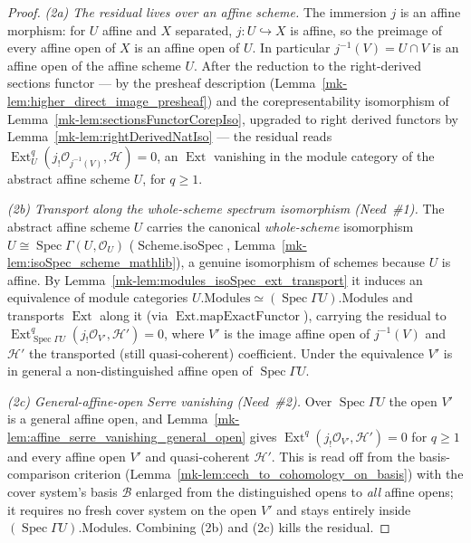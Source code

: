 \begin{proof}
  \emph{(2a) The residual lives over an affine scheme.} The immersion \(j\) is an affine morphism:
  for \(U\) affine and \(X\) separated,
  \(j : U \hookrightarrow X\) is affine, so the preimage of every affine open of \(X\) is an affine
  open of \(U\). In particular \(j^{-1}(V) = U \cap V\) is an
  affine open of the affine scheme \(U\). After the reduction to the right-derived sections functor
  --- by the presheaf description (Lemma~\ref{mk-lem:higher_direct_image_presheaf}) and the
  corepresentability isomorphism of Lemma~\ref{mk-lem:sectionsFunctorCorepIso}, upgraded to right derived
  functors by Lemma~\ref{mk-lem:rightDerivedNatIso} --- the residual reads
  \(\operatorname{Ext}^q_{U}(j_!\mathcal{O}_{j^{-1}(V)}, \mathcal{H}) = 0\), an \(\operatorname{Ext}\)
  vanishing in the module category of the abstract affine scheme \(U\), for \(q \geq 1\).

  \emph{(2b) Transport along the whole-scheme spectrum isomorphism (Need~\#1).} The abstract affine
  scheme \(U\) carries the canonical \emph{whole-scheme} isomorphism
  \(U \cong \operatorname{Spec}\Gamma(U, \mathcal{O}_U)\) (\(\operatorname{Scheme.isoSpec}\),
  Lemma~\ref{mk-lem:isoSpec_scheme_mathlib}), a genuine isomorphism of schemes because \(U\) is affine.
  By Lemma~\ref{mk-lem:modules_isoSpec_ext_transport} it induces an equivalence of module categories
  \(U.\mathrm{Modules} \simeq (\operatorname{Spec}\Gamma U).\mathrm{Modules}\) and transports
  \(\operatorname{Ext}\) along it (via \(\operatorname{Ext.mapExactFunctor}\)), carrying the residual to
  \(\operatorname{Ext}^q_{\operatorname{Spec}\Gamma U}(j_!\mathcal{O}_{V'}, \mathcal{H}') = 0\), where
  \(V'\) is the image affine open of \(j^{-1}(V)\) and \(\mathcal{H}'\) the transported (still
  quasi-coherent) coefficient. Under the equivalence \(V'\) is in general a non-distinguished affine
  open of \(\operatorname{Spec}\Gamma U\).

  \emph{(2c) General-affine-open Serre vanishing (Need~\#2).} Over \(\operatorname{Spec}\Gamma U\) the
  open \(V'\) is a general affine open, and Lemma~\ref{mk-lem:affine_serre_vanishing_general_open} gives
  \(\operatorname{Ext}^q(j_!\mathcal{O}_{V'}, \mathcal{H}') = 0\) for \(q \geq 1\) and every affine
  open \(V'\) and quasi-coherent \(\mathcal{H}'\). This is read off from the basis-comparison criterion
  (Lemma~\ref{mk-lem:cech_to_cohomology_on_basis}) with the cover system's basis \(\mathcal{B}\) enlarged
  from the distinguished opens to \emph{all} affine opens; it requires no fresh cover system on the
  open \(V'\) and stays entirely inside \((\operatorname{Spec}\Gamma U).\mathrm{Modules}\). Combining
  (2b) and (2c) kills the residual.


\end{proof}

